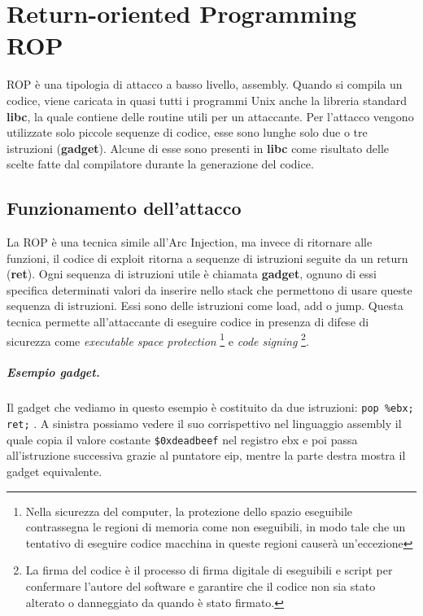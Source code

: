 \chapter{Return-oriented Programming ROP}

ROP è una tipologia di attacco a basso livello, assembly.
Quando si compila un codice, viene caricata in quasi tutti i programmi Unix anche la
libreria standard \textbf{libc}, la quale contiene delle routine utili per un attaccante.
Per l'attacco vengono utilizzate solo piccole sequenze di codice, esse sono lunghe
solo due o tre istruzioni (\textbf{gadget}). Alcune di esse sono presenti in \textbf{libc}
come risultato delle scelte fatte dal compilatore durante la generazione del codice.

\section{Funzionamento dell'attacco}

La ROP è una tecnica simile all'Arc Injection, ma invece di ritornare alle funzioni,
il codice di exploit ritorna a sequenze di istruzioni seguite da un return (\textbf{ret}).
Ogni sequenza di istruzioni utile è chiamata \textbf{gadget},
ognuno di essi specifica determinati valori da inserire nello stack che permettono
di usare queste sequenza di istruzioni.
Essi sono delle istruzioni come load, add o jump. Questa tecnica permette all'attaccante
di eseguire codice in presenza di difese di sicurezza
come \textit{executable space protection}
\footnote{ Nella sicurezza del computer, la protezione dello spazio eseguibile contrassegna
    le regioni di memoria come non eseguibili,
    in modo tale che un tentativo di eseguire codice macchina in queste regioni causerà un'eccezione}
e \textit{code signing}
\footnote{La firma del codice è il processo di firma digitale di eseguibili e script
    per confermare l'autore del software e garantire che
    il codice non sia stato alterato o danneggiato da quando è stato firmato.}.

\newpage

\paragraph{Esempio gadget.} Il gadget che vediamo in questo esempio
è costituito da due istruzioni: \verb|pop %ebx; ret;| . A sinistra possiamo vedere
il suo corrispettivo nel linguaggio assembly il quale copia il valore
costante \verb|$0xdeadbeef| nel registro ebx e poi passa all'istruzione successiva
grazie al puntatore eip, mentre la parte destra mostra il gadget equivalente.

